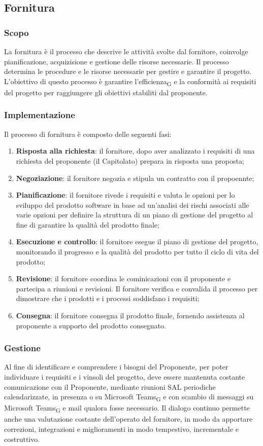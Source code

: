 \subsection{Fornitura}
\subsubsection{Scopo}
La fornitura è il processo che descrive le attività svolte dal fornitore, coinvolge pianificazione, acquizisione e gestione delle risorse necessarie. Il processo determina le procedure e le risorse necessarie per gestire e garantire il progetto. L'obiettivo di questo processo è garantire l'efficienza\textsubscript{G} e la conformità ai requisiti del progetto per raggiungere gli obiettivi stabiliti dal proponente. 
\subsubsection{Implementazione}
Il processo di fornitura è composto delle seguenti fasi:
\begin{enumerate}
    \item \textbf{Risposta alla richiesta}: il fornitore, dopo aver analizzato i requisiti di una richiesta del proponente (il Capitolato) prepara in risposta una proposta;
    \item \textbf{Negoziazione}: il fornitore negozia e stipula un contratto con il propoennte;
    \item \textbf{Pianificazione}: il fornitore rivede i requisiti e valuta le opzioni per lo sviluppo del prodotto software in base ad un'analisi dei rischi associati alle varie opzioni per definire la struttura di un piano di gestione del progetto al fine di garantire la qualità del prodotto finale;
    \item \textbf{Esecuzione e controllo}: il fornitore esegue il piano di gestione del progetto, monitorando il progresso e la qualità del prodotto per tutto il ciclo di vita del prodotto;
    \item \textbf{Revisione}: il fornitore coordina le cominicazioni con il proponente e partecipa a riunioni e revisioni. Il fornitore verifica e convalida il processo per dimostrare che i prodotti e i processi soddisfano i requisiti;
    \item \textbf{Consegna}: il fornitore consegna il prodotto finale, fornendo assistenza al proponente a supporto del prodotto consegnato.
\end{enumerate}

\subsubsection{Gestione}
Al fine di identificare e comprendere i bisogni del Proponente, per poter individuare i requisiti e i vinsoli del progetto, deve essere mantenuta costante comunicazione con il Proponente, mediante riunioni SAL periodiche calendarizzate, in presenza o su Microsoft Teams\textsubscript{G} e con scambio di messaggi su Microsoft Teams\textsubscript{G} e mail qualora fosse necessario. Il dialogo continuo permette anche una valutazione costante dell'operato del fornitore, in modo da apportare correzioni, integrazioni e miglioramenti in modo tempestivo, incrementale e costruttivo.

